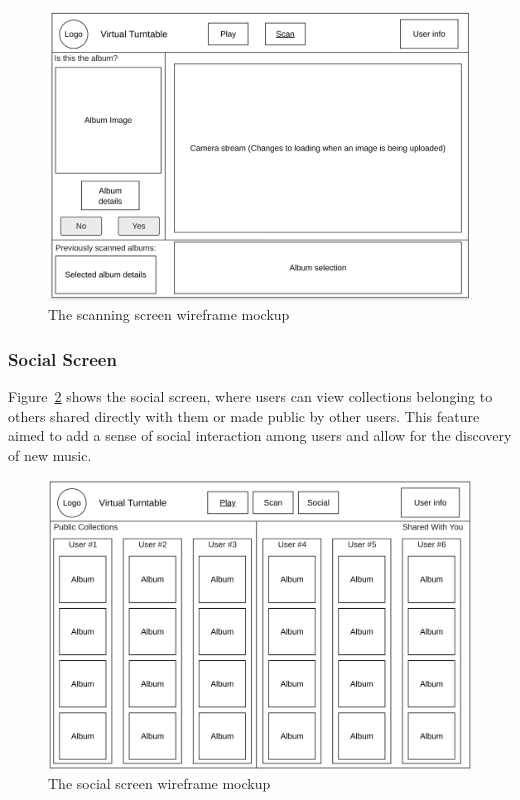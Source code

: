\begin{figure} [H]
    \centering
    \includegraphics[width=0.6\linewidth]{figures/scan_screen_mockup.png}
    \caption{The scanning screen wireframe mockup}
    \label{fig:scan_screen_mockup}
\end{figure}


\subsubsection{Social Screen}
Figure~\ref{fig:social_screen_mockup} shows the social screen, where users can view collections belonging to others shared directly with them or made public by other users. This feature aimed to add a sense of social interaction among users and allow for the discovery of new music.


\begin{figure} [H]
    \centering
    \includegraphics[width=0.6\linewidth]{figures/social_screen_mockup.png}
    \caption{The social screen wireframe mockup}
    \label{fig:social_screen_mockup}
\end{figure}

